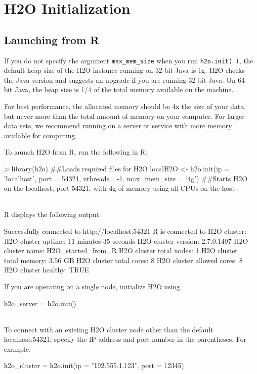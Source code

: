 \documentclass[11pt]{article}
\begin{document}
\section{H2O Initialization}

\subsection{Launching from R}

If you do not specify the argument {\texttt{max\_mem\_size}} when you run {\texttt{h2o.init( )}}, the default heap size of the H2O instance running on 32-bit Java is 1g. H2O checks the Java version and suggests an upgrade if you are running 32-bit Java. On 64-bit Java, the heap size is 1/4 of the total memory available on the machine. 

For best performance, the allocated memory should be 4x the size of your data, but never more than the total amount of memory on your computer. For larger data sets, we recommend running on a server or service with more memory available for computing.


To launch H2O from R, run the following in R:
\begin{spverbatim}
> library(h2o) ##Loads required files for H2O
localH2O <- h2o.init(ip = 'localhost', port = 54321, nthreads= -1, max_mem_size = ‘4g') ##Starts H2O on the localhost, port 54321, with 4g of memory using all CPUs on the host  \end{spverbatim} 
\\

R displays the following output: 
\begin{spverbatim}
Successfully connected to http://localhost:54321
       R is connected to H2O cluster:
   H2O cluster uptime:         11 minutes 35 seconds
   H2O cluster version:        2.7.0.1497
   H2O cluster name:           H2O_started_from_R
   H2O cluster total nodes:    1
   H2O cluster total memory:   3.56 GB
   H2O cluster total cores:    8
   H2O cluster allowed cores:  8
   H2O cluster healthy:        TRUE
\end{spverbatim}

If you are operating on a single node, initialize H2O using \begin{spverbatim} h2o_server = h2o.init()\end{spverbatim}\\

To connect with an existing H2O cluster node other than the default localhost:54321, specify the IP address and port number in the parentheses. For example: \begin{spverbatim}h2o_cluster = h2o.init(ip = "192.555.1.123", port = 12345)\end{spverbatim}
\end{document}
